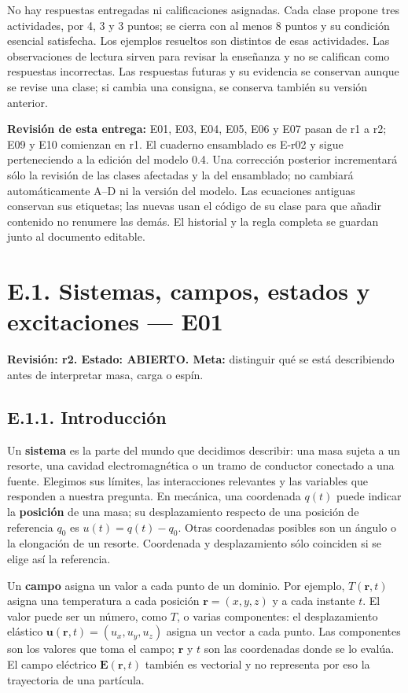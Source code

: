 \documentclass[
  spanish,
  10pt,
  a4paper,
]{article}
\begin{document}
No hay respuestas entregadas ni calificaciones asignadas. Cada clase
propone tres actividades, por 4, 3 y 3 puntos; se cierra con al menos 8
puntos y su condición esencial satisfecha. Los ejemplos resueltos son
distintos de esas actividades. Las observaciones de lectura sirven para
revisar la enseñanza y no se califican como respuestas incorrectas. Las
respuestas futuras y su evidencia se conservan aunque se revise una
clase; si cambia una consigna, se conserva también su versión anterior.

\textbf{Revisión de esta entrega:} E01, E03, E04, E05, E06 y E07 pasan
de r1 a r2; E09 y E10 comienzan en r1. El cuaderno ensamblado es E-r02 y
sigue perteneciendo a la edición del modelo 0.4. Una corrección
posterior incrementará sólo la revisión de las clases afectadas y la del
ensamblado; no cambiará automáticamente A--D ni la versión del modelo.
Las ecuaciones antiguas conservan sus etiquetas; las nuevas usan el
código de su clase para que añadir contenido no renumere las demás. El
historial y la regla completa se guardan junto al documento editable.

\clearpage

\section{E.1. Sistemas, campos, estados y excitaciones ---
E01}\label{e.1.-sistemas-campos-estados-y-excitaciones-e01}

\textbf{Revisión: r2. Estado: ABIERTO. Meta:} distinguir qué se está
describiendo antes de interpretar masa, carga o espín.

\subsection{E.1.1. Introducción}\label{e.1.1.-introducciuxf3n}

Un \textbf{sistema} es la parte del mundo que decidimos describir: una
masa sujeta a un resorte, una cavidad electromagnética o un tramo de
conductor conectado a una fuente. Elegimos sus límites, las
interacciones relevantes y las variables que responden a nuestra
pregunta. En mecánica, una coordenada \(q(t)\) puede indicar la
\textbf{posición} de una masa; su desplazamiento respecto de una
posición de referencia \(q_0\) es \(u(t)=q(t)-q_0\). Otras coordenadas
posibles son un ángulo o la elongación de un resorte. Coordenada y
desplazamiento sólo coinciden si se elige así la referencia.

Un \textbf{campo} asigna un valor a cada punto de un dominio. Por
ejemplo, \(T(\mathbf r,t)\) asigna una temperatura a cada posición
\(\mathbf r=(x,y,z)\) y a cada instante \(t\). El valor puede ser un
número, como \(T\), o varias componentes: el desplazamiento elástico
\(\mathbf u(\mathbf r,t)=(u_x,u_y,u_z)\) asigna un vector a cada punto.
Las componentes son los valores que toma el campo; \(\mathbf r\) y \(t\)
son las coordenadas donde se lo evalúa. El campo eléctrico
\(\mathbf E(\mathbf r,t)\) también es vectorial y no representa por eso
la trayectoria de una partícula.
\end{document}

